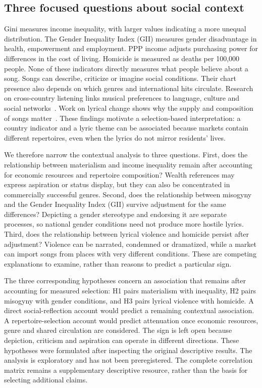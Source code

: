 \subsection{Three focused questions about social context}
Gini measures income inequality, with larger values indicating a more unequal distribution. The Gender Inequality Index (GII) measures gender disadvantage in health, empowerment and employment. PPP income adjusts purchasing power for differences in the cost of living. Homicide is measured as deaths per 100,000 people. None of these indicators directly measures what people believe about a song.
Songs can describe, criticize or imagine social conditions. Their chart presence also depends on which genres and international hits circulate. Research on cross-country listening links musical preferences to language, culture and social networks~\cite{liu}. Work on lyrical change shows why the supply and composition of songs matter~\cite{varnum,parada}. These findings motivate a selection-based interpretation: a country indicator and a lyric theme can be associated because markets contain different repertoires, even when the lyrics do not mirror residents' lives.

We therefore narrow the contextual analysis to three questions. First, does the relationship between materialism and income inequality remain after accounting for economic resources and repertoire composition? Wealth references may express aspiration or status display, but they can also be concentrated in commercially successful genres. Second, does the relationship between misogyny and the Gender Inequality Index (GII) survive adjustment for the same differences? Depicting a gender stereotype and endorsing it are separate processes, so national gender conditions need not produce more hostile lyrics. Third, does the relationship between lyrical violence and homicide persist after adjustment? Violence can be narrated, condemned or dramatized, while a market can import songs from places with very different conditions. These are competing explanations to examine, rather than reasons to predict a particular sign.

The three corresponding hypotheses concern an association that remains after accounting for measured selection: H1 pairs materialism with inequality, H2 pairs misogyny with gender conditions, and H3 pairs lyrical violence with homicide. A direct social-reflection account would predict a remaining contextual association. A repertoire-selection account would predict attenuation once economic resources, genre and shared circulation are considered. The sign is left open because depiction, criticism and aspiration can operate in different directions. These hypotheses were formulated after inspecting the original descriptive results. The analysis is exploratory and has not been preregistered. The complete correlation matrix remains a supplementary descriptive resource, rather than the basis for selecting additional claims.

